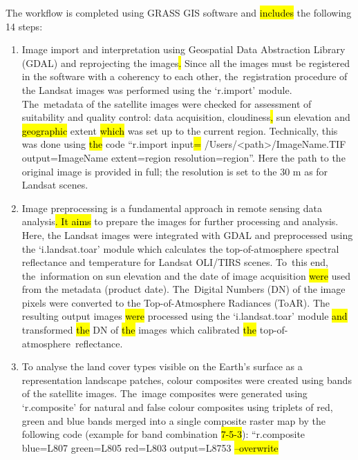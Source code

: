 \documentclass[coasts,article,accept,pdftex,oneauthor]{Definitions/mdpi}
\begin{document}
The workflow is {completed using GRASS GIS software and} \hl{includes} the following {14} steps:

\begin{enumerate}
  \item Image import and interpretation {using Geospatial Data Abstraction Library (GDAL)\hl{ }and reprojecting the images\hl{. }Since all the images must be registered in the software with a coherency to each other, the~registration procedure of the Landsat images was performed using the} `r.import' module. The~metadata of the satellite images were checked for assessment of suitability and quality control: data acquisition, cloudiness\hl{, }sun elevation {and \hl{geographic} extent \hl{which }was set up to the current region. Technically, this was done using \hl{the }code ``r.import input\hl{=}%
/Users/<path>/ImageName.TIF output=ImageName extent=region resolution=region''. Here the path to the original image is provided in full; the resolution is set to the 30 m as for Landsat scenes}.
  \item Image preprocessing is a fundamental approach in remote sensing data analysis\hl{. It  aims} to prepare the images for further processing and analysis. Here, the Landsat images were integrated with GDAL and preprocessed using the `i.landsat.toar'\hl{ }module which calculates the top-of-atmosphere spectral reflectance and temperature for Landsat OLI/TIRS scenes. To~this end, the~information on sun elevation and the date of image acquisition \hl{were} used from the metadata (product date). The~Digital Numbers (DN) of the image pixels were converted to the Top-of-Atmosphere Radiances (ToAR). {The resulting output images \hl{were }processed using the `i.landsat.toar' module \hl{and} transformed \hl{the }DN of \hl{the} images which\hl{ }calibrated \hl{the} top-of-atmosphere~reflectance.}
  \item {To analyse the land cover types visible on the Earth's surface as a representation landscape patches, colour} composites {were created using bands of the satellite images}. The~image composites were generated using `r.composite' for natural and false colour composites using triplets of red, green and blue bands merged into a single composite raster map {by the following code (example for band combination \hl{7-5-3}): ``r.composite blue=L807 green=L805 red=L803 output=L8753 \hl{--overwrite}%
}
\end{enumerate}
\end{document}
